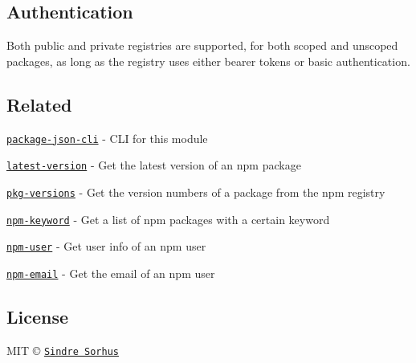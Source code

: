 \subsection*{Authentication}

Both public and private registries are supported, for both scoped and unscoped packages, as long as the registry uses either bearer tokens or basic authentication.

\subsection*{Related}


\begin{DoxyItemize}
\item \href{https://github.com/sindresorhus/package-json-cli}{\tt package-\/json-\/cli} -\/ C\+LI for this module
\item \href{https://github.com/sindresorhus/latest-version}{\tt latest-\/version} -\/ Get the latest version of an npm package
\item \href{https://github.com/sindresorhus/pkg-versions}{\tt pkg-\/versions} -\/ Get the version numbers of a package from the npm registry
\item \href{https://github.com/sindresorhus/npm-keyword}{\tt npm-\/keyword} -\/ Get a list of npm packages with a certain keyword
\item \href{https://github.com/sindresorhus/npm-user}{\tt npm-\/user} -\/ Get user info of an npm user
\item \href{https://github.com/sindresorhus/npm-email}{\tt npm-\/email} -\/ Get the email of an npm user
\end{DoxyItemize}

\subsection*{License}

M\+IT © \href{http://sindresorhus.com}{\tt Sindre Sorhus} 